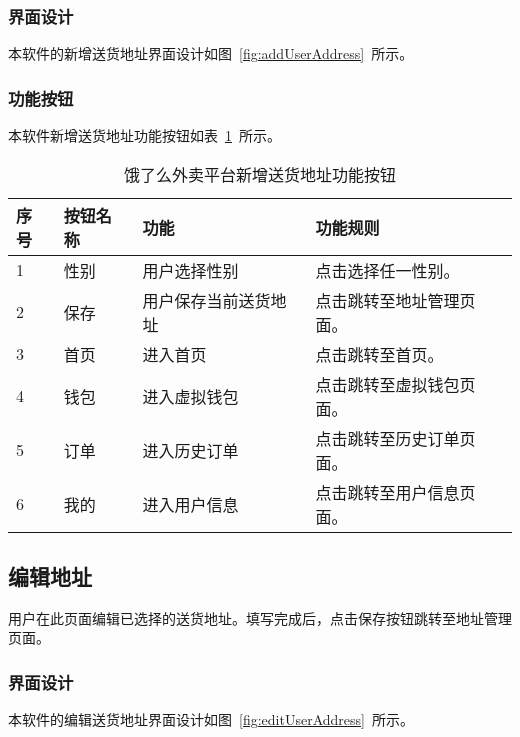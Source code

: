 \subsubsection{界面设计}
本软件的新增送货地址界面设计如图~\ref{fig:addUserAddress}~所示。
\subsubsection{功能按钮}
本软件新增送货地址功能按钮如表~\ref{tab:table14}~所示。
\begin{table}[htbp]
    \caption{饿了么外卖平台新增送货地址功能按钮}\label{tab:table14}
    \vspace{0.5em}\wuhao
    \begin{tabularx}{\textwidth}{lllX}
    \toprule[1.5pt]
    序号 & 按钮名称 & 功能 & 功能规则 \\ 
    \midrule[1pt]
    1 & 性别 & 用户选择性别 & 点击选择任一性别。 \\
    2 & 保存 & 用户保存当前送货地址 & 点击跳转至地址管理页面。 \\
    3 & 首页 & 进入首页 & 点击跳转至首页。 \\
    4 & 钱包 & 进入虚拟钱包 & 点击跳转至虚拟钱包页面。 \\
    5 & 订单 & 进入历史订单 & 点击跳转至历史订单页面。 \\
    6 & 我的 & 进入用户信息 & 点击跳转至用户信息页面。 \\
\bottomrule[1.5pt]
\end{tabularx}
\vspace{\baselineskip}
\end{table}

\subsection{编辑地址}
用户在此页面编辑已选择的送货地址。填写完成后，点击保存按钮跳转至地址管理页面。
\subsubsection{界面设计}
本软件的编辑送货地址界面设计如图~\ref{fig:editUserAddress}~所示。
